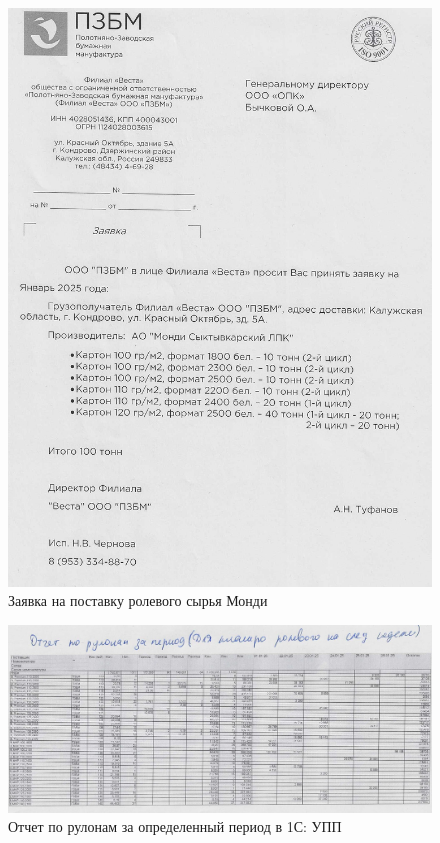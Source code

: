 \begin{figure}
\begin{center}
 \includegraphics[height=0.6\textheight, keepaspectratio]{Pics/VII 8.jpg}
\end{center}
 \caption{Заявка на поставку ролевого сырья Монди}
 \label{pic:VII 8}
\end{figure}

\begin{figure}
\begin{center}
 \includegraphics[height=0.25\textheight, keepaspectratio]{Pics/VII 9.jpg}
\end{center}
 \caption{Отчет по рулонам за определенный период в 1С: УПП}
 \label{pic:VII 9}
\end{figure}

